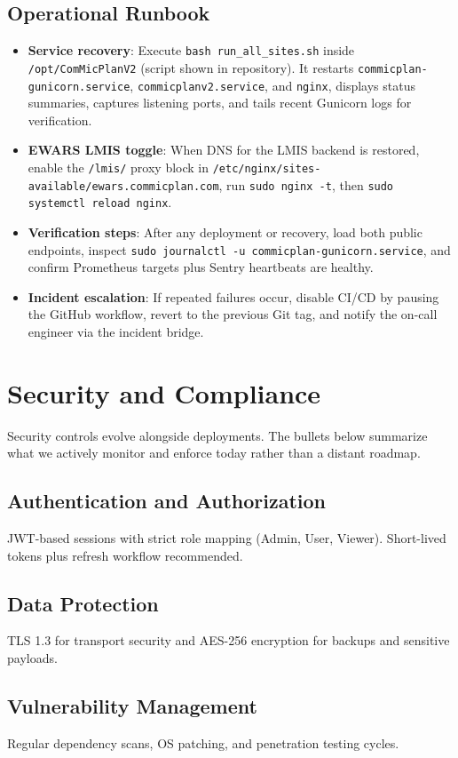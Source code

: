 \documentclass[11pt]{article}
\begin{document}
\subsection{Operational Runbook}
\begin{itemize}[leftmargin=*]
  \item \textbf{Service recovery}: Execute \verb|bash run_all_sites.sh| inside \verb|/opt/ComMicPlanV2| (script shown in repository). It restarts \texttt{commicplan-gunicorn.service}, \texttt{commicplanv2.service}, and \texttt{nginx}, displays status summaries, captures listening ports, and tails recent Gunicorn logs for verification.
  \item \textbf{EWARS LMIS toggle}: When DNS for the LMIS backend is restored, enable the \texttt{/lmis/} proxy block in \texttt{/etc/nginx/sites-available/ewars.commicplan.com}, run \verb|sudo nginx -t|, then \verb|sudo systemctl reload nginx|.
  \item \textbf{Verification steps}: After any deployment or recovery, load both public endpoints, inspect \verb|sudo journalctl -u commicplan-gunicorn.service|, and confirm Prometheus targets plus Sentry heartbeats are healthy.
  \item \textbf{Incident escalation}: If repeated failures occur, disable CI/CD by pausing the GitHub workflow, revert to the previous Git tag, and notify the on-call engineer via the incident bridge.
\end{itemize}

\section{Security and Compliance}
\noindent Security controls evolve alongside deployments. The bullets below summarize what we actively monitor and enforce today rather than a distant roadmap.
\subsection{Authentication and Authorization}
JWT-based sessions with strict role mapping (Admin, User, Viewer). Short-lived tokens plus refresh workflow recommended.

\subsection{Data Protection}
TLS 1.3 for transport security and AES-256 encryption for backups and sensitive payloads.

\subsection{Vulnerability Management}
Regular dependency scans, OS patching, and penetration testing cycles.
\end{document}
